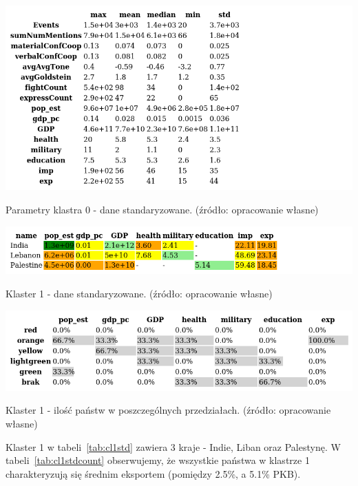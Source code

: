 \documentclass[11pt]{report}
\begin{document}
    \begin{table}[!htp]
        \centering
        \includegraphics[width=\linewidth]{tables/CLUST/desc/clust0std_desc.png}
        \caption{Parametry klastra 0 - dane standaryzowane. (źródło: opracowanie własne)}
        \label{tab:cl0std_desc}
    \end{table}

    \begin{table}[!htp]
        \centering
        \includegraphics[width=\linewidth]{tables/CLUST/cluster1stdkmeans.png}
        \caption{Klaster 1 - dane standaryzowane. (źródło: opracowanie własne)}
        \label{tab:cl1std}
    \end{table}

    \begin{table}[!htp]
        \centering
        \includegraphics[width=\linewidth]{tables/CLUST/cluster1stdkmeanscount.png}
        \caption{Klaster 1 - ilość państw w poszczególnych przedziałach. (źródło: opracowanie własne)}
        \label{tab:cl1stdcount}
    \end{table}

    Klaster 1 w tabeli~\ref{tab:cl1std} zawiera 3 kraje - Indie, Liban oraz Palestynę.
    W tabeli~\ref{tab:cl1stdcount} obserwujemy, że wszystkie państwa w klastrze 1 charakteryzują się średnim eksportem (pomiędzy 2.5\%, a 5.1\% PKB).
\end{document}
